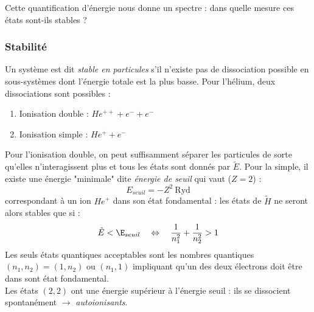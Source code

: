 \documentclass[british,french,11pt, a4paper, openany]{book}
\begin{document}
Cette quantification d'énergie nous donne un spectre : dans quelle mesure ces 
états sont-ils stables ?

\subsubsection{Stabilité}
Un système est dit \textit{stable en particules} s'il n'existe pas de dissociation 
possible en sous-systèmes dont l'énergie totale est la plus basse. Pour l'hélium, 
deux dissociations sont possibles : 
\begin{enumerate}
	\item Ionisation double : $He^{++} + e^- + e^-$
	\item Ionisation simple : $He^{+} + e^-$
\end{enumerate}

Pour l'ionisation double, on peut suffisamment séparer les particules de sorte 
qu'elles n'interagissent plus et tous les états sont donnés par $\tilde{E}$. Pour 
la simple, il existe une énergie "minimale" dite \textit{énergie de seuil} qui 
vaut ($Z=2$) :
\begin{equation}
	E_{seuil} = -Z^2\ \text{Ryd}
\end{equation}
correspondant à un ion $He^+$ dans son état fondamental : les états de $\tilde{H}$
ne seront alors stables que si : 
\begin{equation}
	\tilde{E}<\E_{seuil}\ \ \ \Leftrightarrow\ \ \ \frac{1}{n_1^2}+\frac{1}{n_2^2} >1
\end{equation}
Les seuls états quantiques acceptables sont les nombres quantiques $(n_1,n_2) = (1,
n_2)$ ou $(n_1,1)$ impliquant qu'un des deux électrons doit être dans sont état
fondamental.\\
Les états $(2,2)$ ont une énergie supérieur à l'énergie seuil : ils se dissocient
spontanément $\rightarrow$ \textit{autoionisants}.
\end{document}

